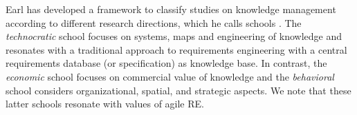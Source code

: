 Earl has developed a framework to classify studies on knowledge management according to different research directions, which he calls schools \cite{Earl2001}.
The \emph{technocratic} school focuses on systems, maps and engineering of knowledge and resonates with a traditional approach to requirements engineering with a central requirements database (or specification) as knowledge base. 
In contrast, the \emph{economic} school focuses on commercial value of knowledge and the \emph{behavioral} school considers organizational, spatial, and strategic aspects.
We note that these latter schools resonate with values of agile RE.